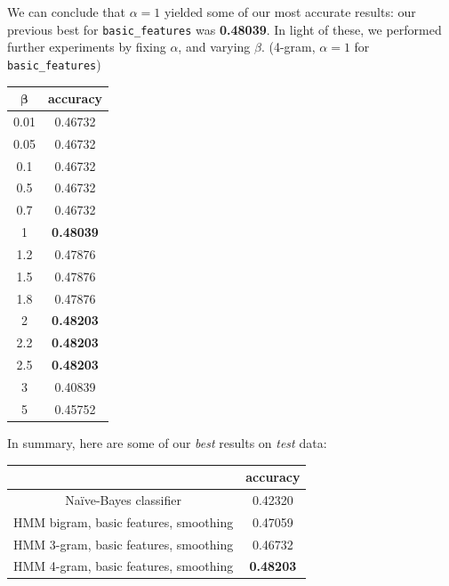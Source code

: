 \documentclass{article}
\begin{document}
\begin{multicols}{2}
We can conclude that $\alpha = 1$ yielded some of our most accurate results: our previous best for \texttt{basic\_features} was \textbf{0.48039}. In light of these, we performed further experiments by fixing $\alpha$, and varying $\beta$. (4-gram, $\alpha = 1$ for \texttt{basic\_features})\par\bigskip

{\small\begin{tabular}{|c|c|}\hline
$\bm{\beta}$ & accuracy\\\hline
0.01 & 0.46732\\
0.05 & 0.46732\\
0.1  & 0.46732\\
0.5  & 0.46732\\
0.7  & 0.46732\\
1    & \textbf{0.48039}\\
1.2  & 0.47876\\
1.5  & 0.47876\\
1.8  & 0.47876\\
2    & \textbf{0.48203}\\
2.2  & \textbf{0.48203}\\
2.5  & \textbf{0.48203}\\
3    & 0.40839\\
5    & 0.45752\\\hline
\end{tabular}}\par\bigskip

In summary, here are some of our \emph{best} results on \emph{test} data:\par\bigskip
\begin{tabular}{|c|c|}\hline
                           & accuracy\\\hline
Na\"{i}ve-Bayes classifier & 0.42320\\
HMM bigram, basic features, smoothing & 0.47059\\
HMM 3-gram, basic features, smoothing & 0.46732\\
HMM 4-gram, basic features, smoothing & \textbf{0.48203}\\\hline
\end{tabular}\par
\end{multicols}
\end{document}
